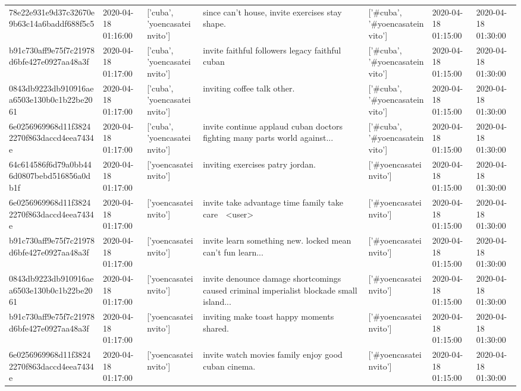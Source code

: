 \begin{tabular}{lllllll}
78e22e931e9d37c32670e9b63c14a6baddf688f5c5 & 2020-04-18 01:16:00 & ['cuba', 'yoencasateinvito'] & since can't house, invite exercises stay shape. & ['#cuba', '#yoencasateinvito'] & 2020-04-18 01:15:00 & 2020-04-18 01:30:00 \\
b91c730aff9e75f7c21978d6bfe427e0927aa48a3f & 2020-04-18 01:17:00 & ['cuba', 'yoencasateinvito'] & invite faithful followers legacy faithful cuban & ['#cuba', '#yoencasateinvito'] & 2020-04-18 01:15:00 & 2020-04-18 01:30:00 \\
0843db9223db910916aea6503e130b0c1b22be2061 & 2020-04-18 01:17:00 & ['cuba', 'yoencasateinvito'] & inviting coffee talk other. & ['#cuba', '#yoencasateinvito'] & 2020-04-18 01:15:00 & 2020-04-18 01:30:00 \\
6e0256969968d11f38242270f863daccd4eea7434e & 2020-04-18 01:17:00 & ['cuba', 'yoencasateinvito'] & invite continue applaud cuban doctors fighting many parts world against... & ['#cuba', '#yoencasateinvito'] & 2020-04-18 01:15:00 & 2020-04-18 01:30:00 \\
64c614586f6d79a0bb446d0807bebd516856a0db1f & 2020-04-18 01:17:00 & ['yoencasateinvito'] & inviting exercises patry jordan. & ['#yoencasateinvito'] & 2020-04-18 01:15:00 & 2020-04-18 01:30:00 \\
6e0256969968d11f38242270f863daccd4eea7434e & 2020-04-18 01:17:00 & ['yoencasateinvito'] & invite take advantage time family take care 💞 <user> & ['#yoencasateinvito'] & 2020-04-18 01:15:00 & 2020-04-18 01:30:00 \\
b91c730aff9e75f7c21978d6bfe427e0927aa48a3f & 2020-04-18 01:17:00 & ['yoencasateinvito'] & invite learn something new. locked mean can't fun learn... & ['#yoencasateinvito'] & 2020-04-18 01:15:00 & 2020-04-18 01:30:00 \\
0843db9223db910916aea6503e130b0c1b22be2061 & 2020-04-18 01:17:00 & ['yoencasateinvito'] & invite denounce damage shortcomings caused criminal imperialist blockade small island... & ['#yoencasateinvito'] & 2020-04-18 01:15:00 & 2020-04-18 01:30:00 \\
b91c730aff9e75f7c21978d6bfe427e0927aa48a3f & 2020-04-18 01:17:00 & ['yoencasateinvito'] & inviting make toast happy moments shared. & ['#yoencasateinvito'] & 2020-04-18 01:15:00 & 2020-04-18 01:30:00 \\
6e0256969968d11f38242270f863daccd4eea7434e & 2020-04-18 01:17:00 & ['yoencasateinvito'] & invite watch movies family enjoy good cuban cinema. & ['#yoencasateinvito'] & 2020-04-18 01:15:00 & 2020-04-18 01:30:00 \\

\end{tabular}
